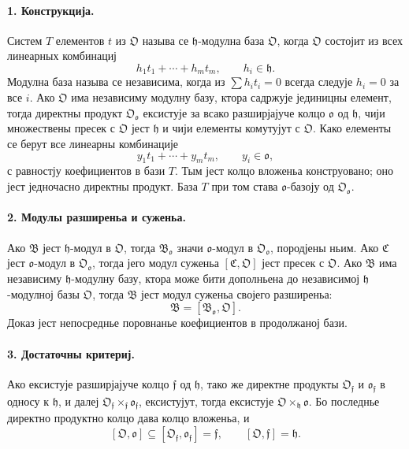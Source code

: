 ﻿\documentclass[11pt]{article}
\begin{document}
\paragraph{1. Конструкција.}
Систем \(T\) елементов \(t\) из \(\mathfrak O\) называ се \(\mathfrak h\)-модулна база \(\mathfrak O\), когда \(\mathfrak O\) состојит из всех линеарных комбинациј
\[
        h_1t_1+\cdots+h_mt_m,
        \qquad h_i\in\mathfrak h.
\]
Модулна база называ се независима, когда из \(\sum h_it_i=0\) всегда следује \(h_i=0\) за все \(i\). Ако \(\mathfrak O\) има независиму модулну базу, ктора садржује јединицны елемент, тогда директны продукт \(\mathfrak O_{\mathfrak o}\) ексистује за всако разширјајуче колцо \(\mathfrak o\) од \(\mathfrak h\), чији множествены пресек с \(\mathfrak O\) јест \(\mathfrak h\) и чији елементы комутујут с \(\mathfrak O\). Како елементы се берут все линеарны комбинације
\[
        y_1t_1+\cdots+y_mt_m,
        \qquad y_i\in\mathfrak o,
\]
с равностју коефициентов в бази \(T\). Тым јест колцо вложеньа конструовано; оно јест једночасно директны продукт. База \(T\) при том става \(\mathfrak o\)-базоју од \(\mathfrak O_{\mathfrak o}\).

\paragraph{2. Модулы разширеньа и суженьа.}
Ако \(\mathfrak B\) јест \(\mathfrak h\)-модул в \(\mathfrak O\), тогда \(\mathfrak B_{\mathfrak o}\) значи \(\mathfrak o\)-модул в \(\mathfrak O_{\mathfrak o}\), породјены ньим. Ако \(\mathfrak C\) јест \(\mathfrak o\)-модул в \(\mathfrak O_{\mathfrak o}\), тогда јего модул суженьа \([\mathfrak C,\mathfrak O]\) јест пресек с \(\mathfrak O\). Ако \(\mathfrak B\) има независиму \(\mathfrak h\)-модулну базу, ктора може бити дополньена до независимој \(\mathfrak h\)-модулној базы \(\mathfrak O\), тогда \(\mathfrak B\) јест модул суженьа својего разширеньа:
\[
        \mathfrak B=[\mathfrak B_{\mathfrak o},\mathfrak O].
\]
Доказ јест непосреднье поровнанье коефициентов в продолжаној бази.

\paragraph{3. Достаточны критериј.}
Ако ексистује разширјајуче колцо \(\mathfrak f\) од \(\mathfrak h\), тако же директне продукты \(\mathfrak O_{\mathfrak f}\) и \(\mathfrak o_{\mathfrak f}\) в односу к \(\mathfrak h\), и далеј \(\mathfrak O_{\mathfrak f}\times_{\mathfrak f}\mathfrak o_{\mathfrak f}\), ексистујут, тогда ексистује \(\mathfrak O\times_{\mathfrak h}\mathfrak o\). Бо последнье директно продуктно колцо дава колцо вложеньа, и
\[
        [\mathfrak O,\mathfrak o]\subseteq [\mathfrak O_{\mathfrak f},\mathfrak o_{\mathfrak f}]=\mathfrak f,
        \qquad [\mathfrak O,\mathfrak f]=\mathfrak h.
\]
\end{document}
